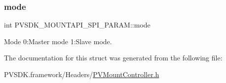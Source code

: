 \subsubsection{\texorpdfstring{mode}{mode}}
{\footnotesize\ttfamily int P\+V\+S\+D\+K\+\_\+\+M\+O\+U\+N\+T\+A\+P\+I\+\_\+\+S\+P\+I\+\_\+\+P\+A\+R\+A\+M\+::mode}



Mode 0\+:Master mode 1\+:Slave mode. 



The documentation for this struct was generated from the following file\+:\begin{DoxyCompactItemize}
\item 
P\+V\+S\+D\+K.\+framework/\+Headers/\hyperlink{_p_v_mount_controller_8h}{P\+V\+Mount\+Controller.\+h}\end{DoxyCompactItemize}
